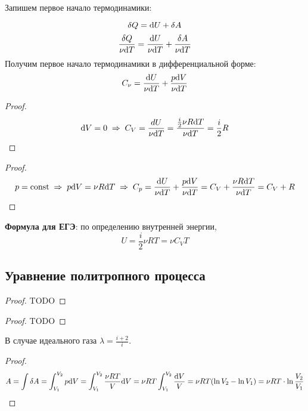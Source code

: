 Запишем первое начало термодинамики:\par
\[\delta Q = \text{d} U + \delta A\]
\[\frac{\delta Q}{\nu \text{d} T} = \frac{\text{d} U}{\nu \text{d} T} + \frac{\delta A}{\nu \text{d} T}\]
Получим первое начало термодинамики в дифференциальной форме:
\[C_\nu=\frac{\text{d} U}{\nu \text{d} T} + \frac{p \text{d} V}{\nu \text{d} T}\]

\begin{proof}
	\[\text{d} V = 0 \;\Rightarrow\; C_V = \frac{dU}{\nu \text{d} T} = \frac{\frac{i}{2}\nu R \text{d} T}{\nu \text{d} T} = \frac{i}{2}R \]
\end{proof}

\begin{proof}
	\[p =\text{const} \;\Rightarrow\; p\text{d} V = \nu R \text{d} T \;\Rightarrow\; C_p = \frac{\text{d} U}{\nu \text{d} T} + \frac{p \text{d} V}{\nu \text{d} T} = C_V + \frac{\nu R \text{d} T}{\nu \text{d} T} = C_V + R\]
\end{proof}

\textbf{Формула для ЕГЭ}: по определению внутренней энергии,
\[U = \frac{i}{2} \nu R T = \nu C_V T\]



\subsection{Уравнение политропного процесса}
\begin{proof}
	TODO\par
\end{proof}

\begin{proof}
	TODO\par
\end{proof}
В случае идеального газа $\displaystyle \lambda = \frac{i + 2}{i}$.

\begin{proof}
	\[A = \int \delta A = 
	\int_{V_1}^{V_2}{p \text{d} V} = 
	\int_{V_1}^{V_2}{\frac{\nu R T}{V} \text{d} V} =
	\nu R T \int_{V_1}^{V_2}{\frac{\text{d} V}{V}} = 
	\nu R T (\ln{V_2} - \ln{V_1}) = \nu R T \cdot \ln{\frac{V_2}{V_1}} \]
\end{proof}